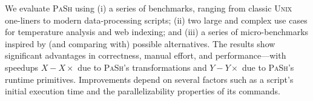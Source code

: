 \documentclass[sigplan, review, screen, anonymous]{acmart}
\newcommand{\sys}{{\scshape PaSh}\xspace}
\newcommand{\unix}{{\scshape Unix}\xspace}
\begin{document}
% 
% 


We evaluate \sys using
  (i) a series of benchmarks, ranging from classic \unix one-liners to modern data-processing scripts;
  (ii) two large and complex use cases for temperature analysis and web indexing;
and 
  (iii) a series of micro-benchmarks inspired by (and
comparing with) possible alternatives.  The results show
significant advantages in correctness, manual effort,
and performance---with 
speedups $X-X\times$ due to \sys's transformations and $Y-Y\times$ due to \sys's runtime primitives.
Improvements depend on several factors such as a script's initial execution time and the parallelizability properties of its commands.
\end{document}

